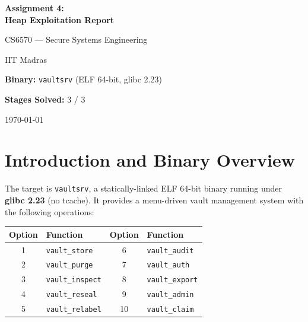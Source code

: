 \documentclass[12pt,a4paper]{article}
\begin{document}
\begin{titlepage}
\centering
\vspace*{2cm}
{\Huge\bfseries Assignment 4:\\[0.3em] Heap Exploitation Report\par}
\vspace{1.5cm}
{\Large CS6570 — Secure Systems Engineering\par}
\vspace{0.5cm}
{\Large IIT Madras\par}
\vspace{2cm}
{\large\textbf{Binary:} \texttt{vaultsrv} (ELF 64-bit, glibc 2.23)\par}
\vspace{0.5cm}
{\large\textbf{Stages Solved:} 3 / 3\par}
\vspace{2cm}
{\large \today\par}
\vfill
\end{titlepage}

\tableofcontents
\newpage

\section{Introduction and Binary Overview}

The target is \texttt{vaultsrv}, a statically-linked ELF 64-bit binary running
under \textbf{glibc 2.23} (no tcache). It provides a menu-driven vault
management system with the following operations:

\begin{center}
\begin{tabular}{cl|cl}
\toprule
\textbf{Option} & \textbf{Function} & \textbf{Option} & \textbf{Function} \\
\midrule
1 & \texttt{vault\_store}   & 6  & \texttt{vault\_audit}  \\
2 & \texttt{vault\_purge}   & 7  & \texttt{vault\_auth}   \\
3 & \texttt{vault\_inspect} & 8  & \texttt{vault\_export} \\
4 & \texttt{vault\_reseal}  & 9  & \texttt{vault\_admin}  \\
5 & \texttt{vault\_relabel} & 10 & \texttt{vault\_claim}  \\
\bottomrule
\end{tabular}
\end{center}
\end{document}
